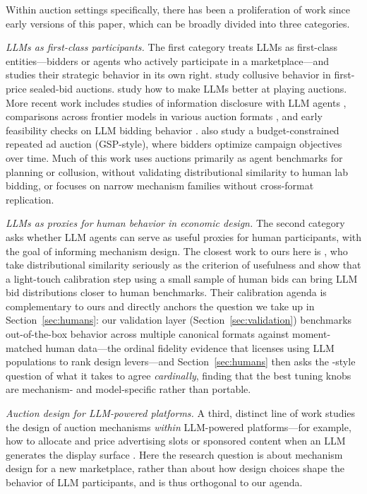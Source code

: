 Within auction settings specifically, there has been a proliferation of work since early versions of this paper, which can be broadly divided into three categories.

\emph{LLMs as first-class participants.} The first category treats LLMs as first-class entities---bidders or agents who actively participate in a marketplace---and studies their strategic behavior in its own right. \citet{fish2024algorithmic} study collusive behavior in first-price sealed-bid auctions. \citet{chen2023put} study how to make LLMs better at playing auctions. More recent work includes studies of information disclosure with LLM agents \citep{infobid2025}, comparisons across frontier models in various auction formats \citep{lu2025claude}, and early feasibility checks on LLM bidding behavior \citep{tsuchihashi2023homo}. \citet{auctionnet2024} also study a budget-constrained repeated ad auction (GSP-style), where bidders optimize campaign objectives over time. Much of this work uses auctions primarily as agent benchmarks for planning or collusion, without validating distributional similarity to human lab bidding, or focuses on narrow mechanism families without cross-format replication.

\emph{LLMs as proxies for human behavior in economic design.} The second category asks whether LLM agents can serve as useful proxies for human participants, with the goal of informing mechanism design. The closest work to ours here is \citet{corrigan2025usefulness}, who take distributional similarity seriously as the criterion of usefulness and show that a light-touch calibration step using a small sample of human bids can bring LLM bid distributions closer to human benchmarks. Their calibration agenda is complementary to ours and directly anchors the question we take up in Section~\ref{sec:humans}: our validation layer (Section~\ref{sec:validation}) benchmarks out-of-the-box behavior across multiple canonical formats against moment-matched human data---the ordinal fidelity evidence that licenses using LLM populations to rank design levers---and Section~\ref{sec:humans} then asks the \citeauthor{corrigan2025usefulness}-style question of what it takes to agree \emph{cardinally}, finding that the best tuning knobs are mechanism- and model-specific rather than portable.

\emph{Auction design for LLM-powered platforms.} A third, distinct line of work studies the design of auction mechanisms \emph{within} LLM-powered platforms---for example, how to allocate and price advertising slots or sponsored content when an LLM generates the display surface \citep{duetting2024mechanism, ramage2024adauctions}. Here the research question is about mechanism design for a new marketplace, rather than about how design choices shape the behavior of LLM participants, and is thus orthogonal to our agenda.

